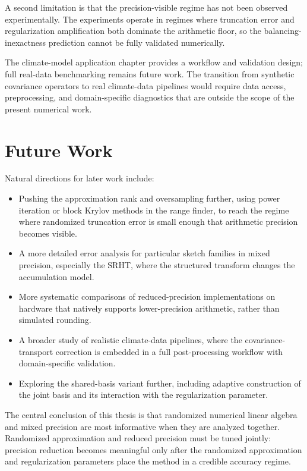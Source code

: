 A second limitation is that the precision-visible regime has not been observed
experimentally. The experiments operate in regimes where truncation
error and regularization amplification both dominate the arithmetic floor, so
the balancing-inexactness prediction cannot be fully validated numerically.

The climate-model application chapter provides a workflow and validation
design; full real-data benchmarking remains future work. The transition from
synthetic covariance operators to real climate-data pipelines would require
data access, preprocessing, and domain-specific diagnostics that are outside
the scope of the present numerical work.

\section*{Future Work}

Natural directions for later work include:

\begin{itemize}
	\item Pushing the approximation rank and oversampling further, using
	      power iteration or block Krylov methods in the range finder, to
	      reach the regime where randomized truncation error is small enough
	      that arithmetic precision becomes visible.
	\item A more detailed error analysis for particular sketch families in
	      mixed precision, especially the SRHT, where the structured transform
	      changes the accumulation model.
	\item More systematic comparisons of reduced-precision implementations on
	      hardware that natively supports lower-precision arithmetic, rather
	      than simulated rounding.
	\item A broader study of realistic climate-data pipelines, where the
	      covariance-transport correction is embedded in a full
	      post-processing workflow with domain-specific validation.
	\item Exploring the shared-basis variant further, including adaptive
	      construction of the joint basis and its interaction with the
	      regularization parameter.
\end{itemize}

The central conclusion of this thesis is that randomized numerical linear
algebra and mixed precision are most informative when they are analyzed
together. Randomized approximation and reduced precision must be tuned
jointly: precision reduction becomes meaningful only after the randomized
approximation and regularization parameters place the method in a credible
accuracy regime.
